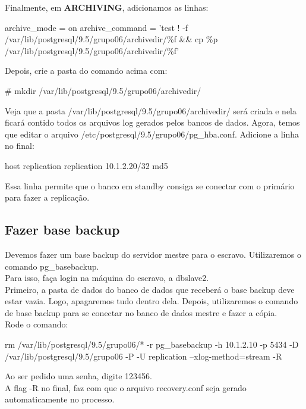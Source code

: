 \documentclass[a4paper,10pt]{article}
\begin{document}
      Finalmente, em \textbf{ARCHIVING}, adicionamos as linhas:
      \begin{spverbatim}
      archive_mode = on
      archive_command = 'test ! -f /var/lib/postgresql/9.5/grupo06/archivedir/\%f && cp \%p /var/lib/postgresql/9.5/grupo06/archivedir/\%f'
      \end{spverbatim}

     Depois, crie a pasta do comando acima com:
      \begin{spverbatim}
      # mkdir /var/lib/postgresql/9.5/grupo06/archivedir/
      \end{spverbatim}

      Veja que a pasta /var/lib/postgresql/9.5/grupo06/archivedir/ será criada e nela ficará contido todos os arquivos log gerados pelos bancos de dados.
      Agora, temos que editar o arquivo /etc/postgresql/9.5/grupo06/pg\_hba.conf. Adicione a linha no final:
      \begin{spverbatim}
      host    replication     replication     10.1.2.20/32    md5
      \end{spverbatim}

      Essa linha permite que o banco em standby consiga se conectar com o primário para fazer a replicação.
    \subsection{Fazer base backup}
        Devemos fazer um base backup do servidor mestre para o escravo. Utilizaremos o comando pg\_basebackup.\\
        Para isso, faça login na máquina do escravo, a dbslave2.\\
        Primeiro, a pasta de dados do banco de dados que receberá o base backup deve estar vazia. Logo, apagaremos tudo dentro dela. Depois, utilizaremos o comando de base backup para se conectar no banco de dados mestre e fazer a cópia.\\
        Rode o comando:
        \begin{spverbatim}
        rm /var/lib/postgresql/9.5/grupo06/* -r
        pg_basebackup -h 10.1.2.10 -p 5434 -D /var/lib/postgresql/9.5/grupo06 -P -U replication --xlog-method=stream -R
        \end{spverbatim}

        Ao ser pedido uma senha, digite 123456.\\
        A flag -R no final, faz com que o arquivo recovery.conf seja gerado automaticamente no processo.
\end{document}
